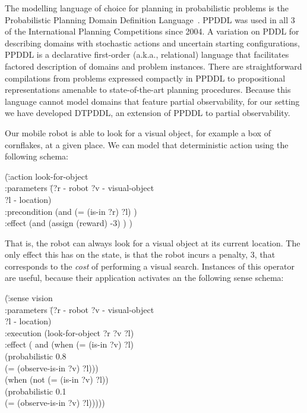 \documentclass[letterpaper]{article}
\begin{document}
The modelling language of choice for planning in probabilistic
problems is the Probabilistic Planning Domain Definition
Language~\cite{younes:littman:04,younes:etal:2005}. PPDDL was used in
all 3 of the International Planning Competitions since 2004. A
variation on PDDL for describing domains with stochastic actions and
uncertain starting configurations, PPDDL is a declarative first-order
(a.k.a., relational) language that facilitates factored description of
domains and problem instances. There are straightforward compilations
from problems expressed compactly in PPDDL to propositional
representations amenable to state-of-the-art planning procedures.
Because this language cannot model domains that feature partial
observability, for our setting we have developed DTPDDL, an extension
of PPDDL to partial observability.


Our mobile robot is able to look for a visual object, for example a
box of cornflakes, at a given place. We can model that deterministic
action using the following schema:


\def\oom{$^{\tt +}$}
\def\zom{$^*$}
\def\bump{\hspace{1cm}}
\def\req#1{$^{\tt #1}$}
\def\noteme#1{}%
\def\notecoauth#1{\ }
\def\notereader#1{[[#1]]}
\def\meta{$\uparrow\uparrow$}
\def\la{\langle}
\def\ra{\rangle}

\small{
\begin{tabtt}
(\= :action look-for-object \\
  \> :parameters \=(?r - robot ?v - visual-object\\
  \> \> ?l - location) \\
  \> :precondition (and (= (is-in ?r) ?l) ) \\
  \> :effect (and (assign (reward) -3) ) ) \\
\end{tabtt}
}

\noindent That is, the robot can always look for a visual object at
its current location. The only effect this has on the state, is that
the robot incurs a penalty, $3$, that corresponds to the {\em cost} of
performing a visual search. Instances of this operator are useful,
because their application activates an the following sense schema:

\small{
\begin{tabtt}
(\= :sense vision \\
  \> :parameters \=(?r - robot ?v - visual-object\\
  \> \> ?l - location) \\
  \> :execution (look-for-object ?r ?v ?l) \\
  \> :effect ( and (when (= (is-in ?v) ?l) \\
  \> \bump (probabilistic 0.8 \\
  \> \bump (= (observe-is-in ?v) ?l))) \\
  \> (when (not (= (is-in ?v) ?l)) \\
  \> \bump (probabilistic 0.1 \\
  \> \bump (= (observe-is-in ?v) ?l))))) \\
\end{tabtt}
}
\end{document}
